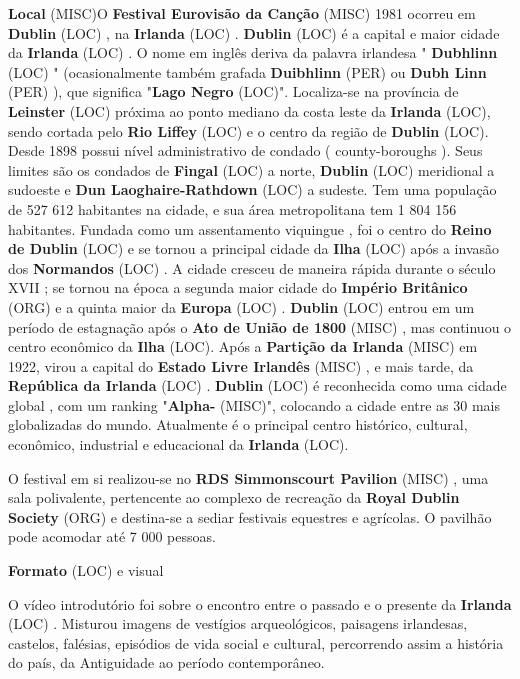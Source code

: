\documentclass[12pt,a4paper]{article}
\begin{document}
\textbf{Local} (MISC)O \textbf{Festival Eurovisão da Canção} (MISC) 1981 ocorreu em \textbf{Dublin} (LOC) , na \textbf{Irlanda} (LOC) . \textbf{Dublin} (LOC) é a capital e maior cidade da \textbf{Irlanda} (LOC) . O nome em inglês deriva da palavra irlandesa " \textbf{Dubhlinn} (LOC) " (ocasionalmente também grafada \textbf{Duibhlinn} (PER) ou \textbf{Dubh Linn} (PER) ), que significa "\textbf{Lago Negro} (LOC)". Localiza-se na província de \textbf{Leinster} (LOC) próxima ao ponto mediano da costa leste da \textbf{Irlanda} (LOC), sendo cortada pelo \textbf{Rio Liffey} (LOC) e o centro da região de \textbf{Dublin} (LOC). Desde 1898 possui nível administrativo de condado ( county-boroughs ). Seus limites são os condados de \textbf{Fingal} (LOC) a norte, \textbf{Dublin} (LOC) meridional a sudoeste e \textbf{Dun Laoghaire-Rathdown} (LOC) a sudeste. Tem uma população de 527 612 habitantes na cidade, e sua área metropolitana tem 1 804 156 habitantes. Fundada como um assentamento viquingue , foi o centro do \textbf{Reino de Dublin} (LOC) e se tornou a principal cidade da \textbf{Ilha} (LOC) após a invasão dos \textbf{Normandos} (LOC) . A cidade cresceu de maneira rápida durante o século XVII ; se tornou na época a segunda maior cidade do \textbf{Império Britânico} (ORG) e a quinta maior da \textbf{Europa} (LOC) . \textbf{Dublin} (LOC) entrou em um período de estagnação após o \textbf{Ato de União de 1800} (MISC) , mas continuou o centro econômico da \textbf{Ilha} (LOC). Após a \textbf{Partição da Irlanda} (MISC) em 1922, virou a capital do \textbf{Estado Livre Irlandês} (MISC) , e mais tarde, da \textbf{República da Irlanda} (LOC) . \textbf{Dublin} (LOC) é reconhecida como uma cidade global , com um ranking "\textbf{Alpha-} (MISC)", colocando a cidade entre as 30 mais globalizadas do mundo. Atualmente é o principal centro histórico, cultural, econômico, industrial e educacional da \textbf{Irlanda} (LOC).

O festival em si realizou-se no \textbf{RDS Simmonscourt Pavilion} (MISC) , uma sala polivalente, pertencente ao complexo de recreação da \textbf{Royal Dublin Society} (ORG) e destina-se a sediar festivais equestres e agrícolas. O pavilhão pode acomodar até 7 000 pessoas.



\textbf{Formato} (LOC) e visual

O vídeo introdutório foi sobre o encontro entre o passado e o presente da \textbf{Irlanda} (LOC) . Misturou imagens de vestígios arqueológicos, paisagens irlandesas, castelos, falésias, episódios de vida social e cultural, percorrendo assim a história do país, da Antiguidade ao período contemporâneo.
\end{document}
